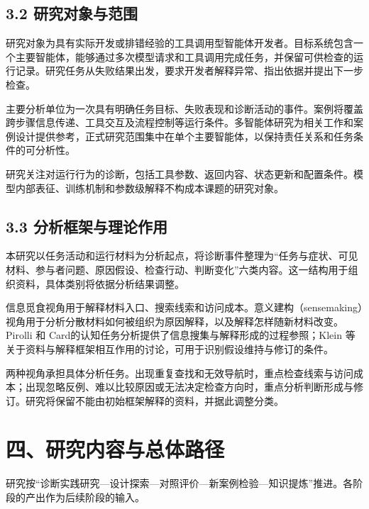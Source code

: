 \subsection{3.2 研究对象与范围}

研究对象为具有实际开发或排错经验的工具调用型智能体开发者。目标系统包含一个主要智能体，能够通过多次模型请求和工具调用完成任务，并保留可供检查的运行记录。研究任务从失败结果出发，要求开发者解释异常、指出依据并提出下一步检查。

主要分析单位为一次具有明确任务目标、失败表现和诊断活动的事件。案例将覆盖跨步骤信息传递、工具交互及流程控制等运行条件。多智能体研究为相关工作和案例设计提供参考，正式研究范围集中在单个主要智能体，以保持责任关系和任务条件的可分析性。

研究关注对运行行为的诊断，包括工具参数、返回内容、状态更新和配置条件。模型内部表征、训练机制和参数级解释不构成本课题的研究对象。

\subsection{3.3 分析框架与理论作用}

本研究以任务活动和运行材料为分析起点，将诊断事件整理为“任务与症状、可见材料、参与者问题、原因假设、检查行动、判断变化”六类内容。这一结构用于组织资料，具体类别将依据分析结果调整。

信息觅食视角用于解释材料入口、搜索线索和访问成本。意义建构（sensemaking）视角用于分析分散材料如何被组织为原因解释，以及解释怎样随新材料改变。Pirolli 和 Card\cite{ref17}的认知任务分析提供了信息搜集与解释形成的过程参照；Klein 等\cite{ref11}关于资料与解释框架相互作用的讨论，可用于识别假设维持与修订的条件。

两种视角承担具体分析任务。出现重复查找和无效导航时，重点检查线索与访问成本；出现忽略反例、难以比较原因或无法决定检查方向时，重点分析判断形成与修订。研究将保留不能由初始框架解释的资料，并据此调整分类。

\section{四、研究内容与总体路径}

研究按“诊断实践研究—设计探索—对照评价—新案例检验—知识提炼”推进。各阶段的产出作为后续阶段的输入。

